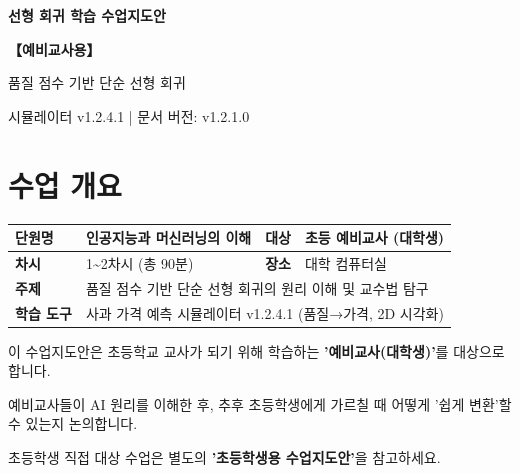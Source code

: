 \documentclass[11pt,a4paper]{article}
\begin{document}
\begin{center}
\vspace*{0.5cm}
{\Huge\bfseries\color{applered}  선형 회귀 학습 수업지도안}

\vspace{0.4cm}
{\LARGE\bfseries 【예비교사용】}

\vspace{0.2cm}
{\large 품질 점수 기반 단순 선형 회귀}

\vspace{0.8cm}
\begin{tcolorbox}[colback=lightcyan,colframe=teal,width=0.7\textwidth]
\centering
\large 시뮬레이터 v1.2.4.1 \quad | \quad 문서 버전: v1.2.1.0
\end{tcolorbox}
\end{center}

\vspace{0.5cm}
\tableofcontents
\newpage

\section{수업 개요}

\begin{center}
\begin{tabular}{|>{\bfseries}p{2.5cm}|p{4.5cm}|>{\bfseries}p{2cm}|p{4.5cm}|}
\hline
단원명 & 인공지능과 머신러닝의 이해 & 대상 & 초등 예비교사 (대학생) \\
\hline
차시 & 1\textasciitilde2차시 (총 90분) & 장소 & 대학 컴퓨터실 \\
\hline
주제 & \multicolumn{3}{p{11cm}|}{품질 점수 기반 단순 선형 회귀의 원리 이해 및 교수법 탐구} \\
\hline
학습 도구 & \multicolumn{3}{p{11cm}|}{사과 가격 예측 시뮬레이터 v1.2.4.1 (품질→가격, 2D 시각화)} \\
\hline
\end{tabular}
\end{center}

\begin{tcolorbox}[colback=lightyellow,colframe=orange,title=\textbf{\texttwemoji{pushpin} 본 수업지도안의 대상}]
이 수업지도안은 초등학교 교사가 되기 위해 학습하는 \textbf{'예비교사(대학생)'}를 대상으로 합니다.

예비교사들이 AI 원리를 이해한 후, 추후 초등학생에게 가르칠 때 어떻게 '쉽게 변환'할 수 있는지 논의합니다.

\vspace{0.2cm}
 초등학생 직접 대상 수업은 별도의 \textbf{'초등학생용 수업지도안'}을 참고하세요.
\end{tcolorbox}
\end{document}
